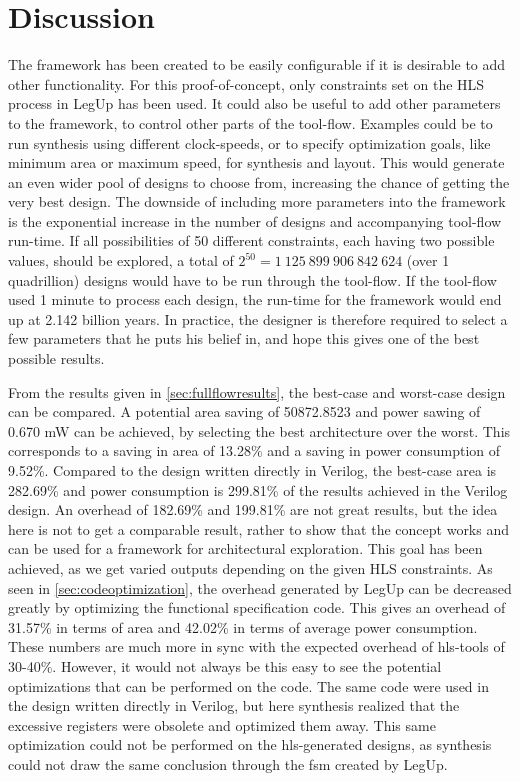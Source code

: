 \chapter{\label{chp:discussion}Discussion}

The framework has been created to be easily configurable if it is desirable to add other functionality. For this proof-of-concept, only constraints set on the HLS process in LegUp has been used. It could also be useful to add other parameters to the framework, to control other parts of the tool-flow. Examples could be to run synthesis using different clock-speeds, or to specify optimization goals, like minimum area or maximum speed, for synthesis and layout. This would generate an even wider pool of designs to choose from, increasing the chance of getting the very best design. The downside of including more parameters into the framework is the exponential increase in the number of designs and accompanying tool-flow run-time. If all possibilities of 50 different constraints, each having two possible values, should be explored, a total of $2^{50} = 1~125~899~906~842~624$ (over 1 quadrillion) designs would have to be run through the tool-flow. If the tool-flow used 1 minute to process each design, the run-time for the framework would end up at 2.142 billion years. In practice, the designer is therefore required to select a few parameters that he puts his belief in, and hope this gives one of the best possible results.

From the results given in \cref{sec:fullflowresults}, the best-case and worst-case design can be compared. A potential area saving of 50872.8523 and power sawing of 0.670 mW can be achieved, by selecting the best architecture over the worst. This corresponds to a saving in area of 13.28\% and a saving in power consumption of 9.52\%. Compared to the design written directly in Verilog, the best-case area is 282.69\% and power consumption is 299.81\% of the results achieved in the Verilog design. An overhead of 182.69\% and 199.81\% are not great results, but the idea here is not to get a comparable result, rather to show that the concept works and can be used for a framework for architectural exploration. This goal has been achieved, as we get varied outputs depending on the given HLS constraints. As seen in \cref{sec:codeoptimization}, the overhead generated by LegUp can be decreased greatly by optimizing the functional specification code. This gives an overhead of 31.57\% in terms of area and 42.02\% in terms of average power consumption. These numbers are much more in sync with the expected overhead of \gls{hls}-tools of 30-40\%. However, it would not always be this easy to see the potential optimizations that can be performed on the code. The same code were used in the design written directly in Verilog, but here synthesis realized that the excessive registers were obsolete and optimized them away. This same optimization could not be performed on the \gls{hls}-generated designs, as synthesis could not draw the same conclusion through the \gls{fsm} created by LegUp.

